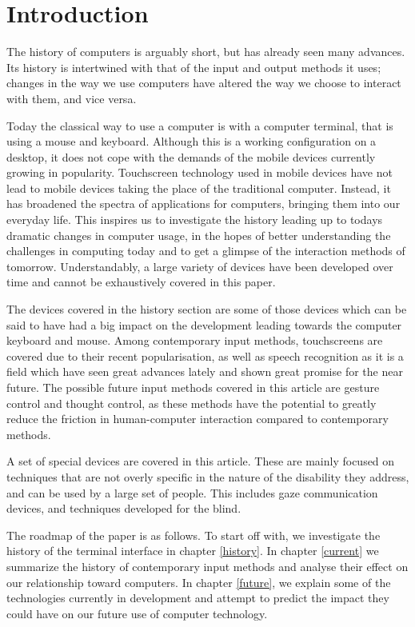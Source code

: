 
\section{Introduction}

The history of computers is arguably short, but has already seen many advances. Its history is intertwined with that of the input and output methods it uses; changes in the way we use computers have altered the way we choose to interact with them, and vice versa. 

Today the classical way to use a computer is with a computer terminal, that is using a mouse and keyboard. Although this is a working configuration on a desktop, it does not cope with the demands of the mobile devices currently growing in popularity. Touchscreen technology used in mobile devices have not lead to mobile devices taking the place of the traditional computer. Instead, it has broadened the spectra of applications for computers, bringing them into our everyday life. This inspires us to investigate the history leading up to todays dramatic changes in computer usage, in the hopes of better understanding the challenges in computing today and to get a glimpse of the interaction methods of tomorrow. Understandably, a large variety of devices have been developed over time and cannot be exhaustively covered in this paper.

The devices covered in the history section are some of those devices which can be said to have had a big impact on the development leading towards the computer keyboard and mouse. Among contemporary input methods, touchscreens are covered due to their recent popularisation, as well as speech recognition as it is a field which have seen great advances lately and shown great promise for the near future. The possible future input methods covered in this article are gesture control and thought control, as these methods have the potential to greatly reduce the friction in human-computer interaction compared to contemporary methods.

A set of special devices are covered in this article. These are mainly focused on techniques that are not overly specific in the nature of the disability they address, and can be used by a large set of people. This includes gaze communication devices, and techniques developed for the blind.

The roadmap of the paper is as follows. To start off with, we investigate the history of the terminal interface in chapter \ref{history}. In chapter \ref{current} we summarize the history of contemporary input methods and analyse their effect on our relationship toward computers. In chapter \ref{future}, we explain some of the technologies currently in development and attempt to predict the impact they could have on our future use of computer technology.
